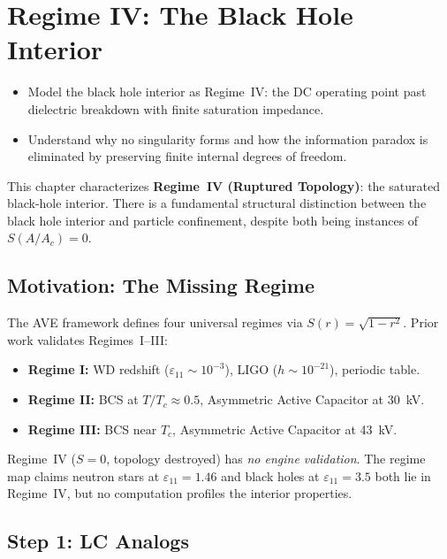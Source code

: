 \chapter{Regime IV: The Black Hole Interior}
\label{ch:bh_interior}


\begin{objectivebox}
\begin{itemize}
    \item Model the black hole interior as Regime~IV: the DC operating point past dielectric breakdown with finite saturation impedance.
    \item Understand why no singularity forms and how the information paradox is eliminated by preserving finite internal degrees of freedom.
\end{itemize}
\end{objectivebox}

This chapter characterizes \textbf{Regime~IV (Ruptured Topology)}: the
saturated black-hole interior. There is a fundamental structural distinction
between the black hole interior and particle confinement, despite both being
instances of $S(A/A_c) = 0$.

\section{Motivation: The Missing Regime}

The AVE framework defines four universal regimes via $S(r) = \sqrt{1 - r^2}$.
Prior work validates Regimes~I--III:
\begin{itemize}
    \item \textbf{Regime I:} WD redshift ($\varepsilon_{11} \sim 10^{-3}$),
          LIGO ($h \sim 10^{-21}$), periodic table.
    \item \textbf{Regime II:} BCS at $T/T_c \approx 0.5$, Asymmetric Active Capacitor at 30~kV.
    \item \textbf{Regime III:} BCS near $T_c$, Asymmetric Active Capacitor at 43~kV.
\end{itemize}
Regime~IV ($S = 0$, topology destroyed) has \textit{no engine validation}.
The regime map claims neutron stars at $\varepsilon_{11} = 1.46$
and black holes at $\varepsilon_{11} = 3.5$ both lie in Regime~IV,
but no computation profiles the interior properties.

\section{Step 1: LC Analogs}

